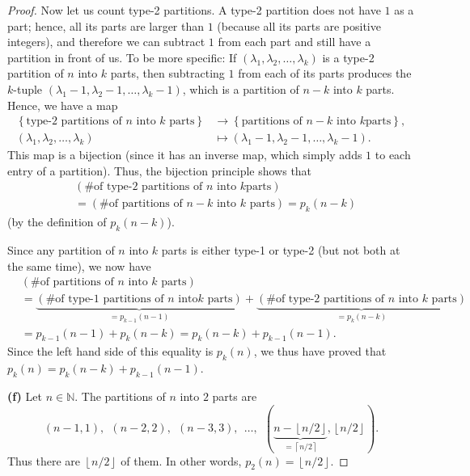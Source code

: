 \begin{proof}
Now let us count type-2 partitions. A type-2 partition does not have $1$ as a
part; hence, all its parts are larger than $1$ (because all its parts are
positive integers), and therefore we can subtract $1$ from each part and still
have a partition in front of us. To be more specific: If $\left(  \lambda
_{1},\lambda_{2},\ldots,\lambda_{k}\right)  $ is a type-2 partition of $n$
into $k$ parts, then subtracting $1$ from each of its parts produces the
$k$-tuple $\left(  \lambda_{1}-1,\lambda_{2}-1,\ldots,\lambda_{k}-1\right)  $,
which is a partition of $n-k$ into $k$ parts. Hence, we have a map%
\begin{align*}
\left\{  \text{type-2 partitions of }n\text{ into }k\text{ parts}\right\}   &
\rightarrow\left\{  \text{partitions of }n-k\text{ into }k\text{
parts}\right\}  ,\\
\left(  \lambda_{1},\lambda_{2},\ldots,\lambda_{k}\right)   &  \mapsto\left(
\lambda_{1}-1,\lambda_{2}-1,\ldots,\lambda_{k}-1\right)  .
\end{align*}
This map is a bijection (since it has an inverse map, which simply adds $1$ to
each entry of a partition). Thus, the bijection principle shows that%
\begin{align*}
&  \left(  \text{\# of type-2 partitions of }n\text{ into }k\text{
parts}\right) \\
&  =\left(  \text{\# of partitions of }n-k\text{ into }k\text{ parts}\right)
=p_{k}\left(  n-k\right)
\end{align*}
(by the definition of $p_{k}\left(  n-k\right)  $).

Since any partition of $n$ into $k$ parts is either type-1 or type-2 (but not
both at the same time), we now have%
\begin{align*}
&  \left(  \text{\# of partitions of }n\text{ into }k\text{ parts}\right) \\
&  =\underbrace{\left(  \text{\# of type-1 partitions of }n\text{ into
}k\text{ parts}\right)  }_{=p_{k-1}\left(  n-1\right)  }+\underbrace{\left(
\text{\# of type-2 partitions of }n\text{ into }k\text{ parts}\right)
}_{=p_{k}\left(  n-k\right)  }\\
&  =p_{k-1}\left(  n-1\right)  +p_{k}\left(  n-k\right)  =p_{k}\left(
n-k\right)  +p_{k-1}\left(  n-1\right)  .
\end{align*}
Since the left hand side of this equality is $p_{k}\left(  n\right)  $, we
thus have proved that $p_{k}\left(  n\right)  =p_{k}\left(  n-k\right)
+p_{k-1}\left(  n-1\right)  $. \medskip

\textbf{(f)} Let $n\in\mathbb{N}$. The partitions of $n$ into $2$ parts are%
\[
\left(  n-1,1\right)  ,\ \ \left(  n-2,2\right)  ,\ \ \left(  n-3,3\right)
,\ \ \ldots,\ \ \left(  \underbrace{n-\left\lfloor n/2\right\rfloor
}_{=\left\lceil n/2\right\rceil },\left\lfloor n/2\right\rfloor \right)  .
\]
Thus there are $\left\lfloor n/2\right\rfloor $ of them. In other words,
$p_{2}\left(  n\right)  =\left\lfloor n/2\right\rfloor $. \medskip


\end{proof}
